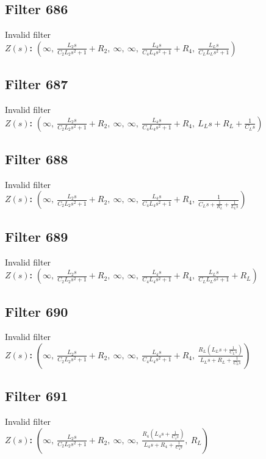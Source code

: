 \documentclass{article}
\begin{document}
\subsection*{Filter 686}
Invalid filter \\ 
\textbf{$Z(s)$:} $\left( \infty, \  \frac{L_{2} s}{C_{2} L_{2} s^{2} + 1} + R_{2}, \  \infty, \  \infty, \  \frac{L_{4} s}{C_{4} L_{4} s^{2} + 1} + R_{4}, \  \frac{L_{L} s}{C_{L} L_{L} s^{2} + 1}\right)$ \\ 
\subsection*{Filter 687}
Invalid filter \\ 
\textbf{$Z(s)$:} $\left( \infty, \  \frac{L_{2} s}{C_{2} L_{2} s^{2} + 1} + R_{2}, \  \infty, \  \infty, \  \frac{L_{4} s}{C_{4} L_{4} s^{2} + 1} + R_{4}, \  L_{L} s + R_{L} + \frac{1}{C_{L} s}\right)$ \\ 
\subsection*{Filter 688}
Invalid filter \\ 
\textbf{$Z(s)$:} $\left( \infty, \  \frac{L_{2} s}{C_{2} L_{2} s^{2} + 1} + R_{2}, \  \infty, \  \infty, \  \frac{L_{4} s}{C_{4} L_{4} s^{2} + 1} + R_{4}, \  \frac{1}{C_{L} s + \frac{1}{R_{L}} + \frac{1}{L_{L} s}}\right)$ \\ 
\subsection*{Filter 689}
Invalid filter \\ 
\textbf{$Z(s)$:} $\left( \infty, \  \frac{L_{2} s}{C_{2} L_{2} s^{2} + 1} + R_{2}, \  \infty, \  \infty, \  \frac{L_{4} s}{C_{4} L_{4} s^{2} + 1} + R_{4}, \  \frac{L_{L} s}{C_{L} L_{L} s^{2} + 1} + R_{L}\right)$ \\ 
\subsection*{Filter 690}
Invalid filter \\ 
\textbf{$Z(s)$:} $\left( \infty, \  \frac{L_{2} s}{C_{2} L_{2} s^{2} + 1} + R_{2}, \  \infty, \  \infty, \  \frac{L_{4} s}{C_{4} L_{4} s^{2} + 1} + R_{4}, \  \frac{R_{L} \left(L_{L} s + \frac{1}{C_{L} s}\right)}{L_{L} s + R_{L} + \frac{1}{C_{L} s}}\right)$ \\ 
\subsection*{Filter 691}
Invalid filter \\ 
\textbf{$Z(s)$:} $\left( \infty, \  \frac{L_{2} s}{C_{2} L_{2} s^{2} + 1} + R_{2}, \  \infty, \  \infty, \  \frac{R_{4} \left(L_{4} s + \frac{1}{C_{4} s}\right)}{L_{4} s + R_{4} + \frac{1}{C_{4} s}}, \  R_{L}\right)$ \\ 
\end{document}

